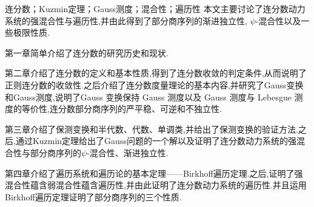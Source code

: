\begin{cnabstract}{连分数；Kuzmin定理；Gauss测度；混合性；遍历性}
\hspace{2em}
本文主要讨论了连分数动力系统的强混合性与遍历性,并由此得到了部分商序列的渐进独立性, $\psi$-混合性以及一些极限性质.\par
第一章简单介绍了连分数的研究历史和现状.\par
第二章介绍了连分数的定义和基本性质,得到了连分数收敛的判定条件,从而说明了正则连分数的收敛性.之后介绍了连分数度量理论的基本内容,并研究了Gauss变换和Gauss测度,说明了Gauss 变换保持 Gauss 测度以及 Gauss 测度与 Lebesgue 测度的等价性,连分数部分商序列的严平稳、可逆和不独立性.\par
第三章介绍了保测变换和半代数、代数、单调类,并给出了保测变换的验证方法.之后,通过Kuzmin定理给出了Gauss问题的一个解以及证明了连分数动力系统的强混合性与部分商序列的$\psi$-混合性、渐进独立性.\par
第四章介绍了遍历系统和遍历论的基本定理——Birkhoff遍历定理.之后,证明了强混合性蕴含弱混合性蕴含遍历性,并由此证明了连分数动力系统的遍历性.并且运用Birkhoff遍历定理证明了部分商序列的三个性质.

\end{cnabstract}